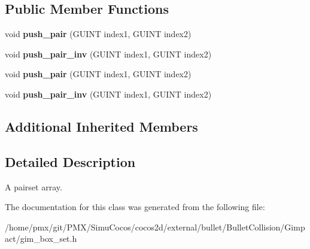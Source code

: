\subsection*{Public Member Functions}
\begin{DoxyCompactItemize}
\item 
\mbox{\label{classgim__pair__set_a7e0cb8a54afd07dc417050303613e578}} 
void {\bfseries push\+\_\+pair} (G\+U\+I\+NT index1, G\+U\+I\+NT index2)
\item 
\mbox{\label{classgim__pair__set_aa48f0ccf3c68ffc6e3b5d121323f3aea}} 
void {\bfseries push\+\_\+pair\+\_\+inv} (G\+U\+I\+NT index1, G\+U\+I\+NT index2)
\item 
\mbox{\label{classgim__pair__set_a7e0cb8a54afd07dc417050303613e578}} 
void {\bfseries push\+\_\+pair} (G\+U\+I\+NT index1, G\+U\+I\+NT index2)
\item 
\mbox{\label{classgim__pair__set_aa48f0ccf3c68ffc6e3b5d121323f3aea}} 
void {\bfseries push\+\_\+pair\+\_\+inv} (G\+U\+I\+NT index1, G\+U\+I\+NT index2)
\end{DoxyCompactItemize}
\subsection*{Additional Inherited Members}


\subsection{Detailed Description}
A pairset array. 

The documentation for this class was generated from the following file\+:\begin{DoxyCompactItemize}
\item 
/home/pmx/git/\+P\+M\+X/\+Simu\+Cocos/cocos2d/external/bullet/\+Bullet\+Collision/\+Gimpact/gim\+\_\+box\+\_\+set.\+h\end{DoxyCompactItemize}
